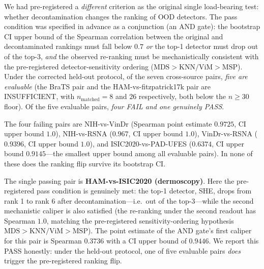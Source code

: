 \documentclass{article}
\begin{document}
We had pre-registered a \emph{different} criterion as the original single
load-bearing test: whether decontamination changes the ranking of OOD detectors.
The pass condition was specified in advance as a conjunction (an AND gate): the
bootstrap CI upper bound of the Spearman correlation between the original and
decontaminated rankings must fall below $0.7$ \emph{or} the top-1 detector must
drop out of the top-3, \emph{and} the observed re-ranking must be mechanistically
consistent with the pre-registered detector-sensitivity ordering
($\text{MDS} > \text{KNN/ViM} > \text{MSP}$). Under the corrected held-out
protocol, of the seven cross-source pairs, \emph{five are evaluable} (the BraTS
pair and the HAM-vs-fitzpatrick17k pair are INSUFFICIENT, with
$n_\text{matched} = 8$ and $26$ respectively, both below the $n \ge 30$ floor).
Of the five evaluable pairs, \emph{four FAIL and one genuinely PASS}.

The four failing pairs are NIH-vs-VinDr (Spearman point estimate $0.9725$, CI
upper bound $1.0$), NIH-vs-RSNA ($0.967$, CI upper bound $1.0$), VinDr-vs-RSNA
($0.9396$, CI upper bound $1.0$), and ISIC2020-vs-PAD-UFES ($0.6374$, CI upper
bound $0.9145$---the smallest upper bound among all evaluable pairs). In none of
these does the ranking flip survive its bootstrap CI.

The single passing pair is \textbf{HAM-vs-ISIC2020 (dermoscopy)}. Here the
pre-registered pass condition is genuinely met: the top-1 detector, SHE, drops
from rank 1 to rank 6 after decontamination---i.e.\ out of the top-3---while the
second mechanistic caliper is also satisfied (the re-ranking under the second
readout has Spearman $1.0$, matching the pre-registered sensitivity-ordering
hypothesis $\text{MDS} > \text{KNN/ViM} > \text{MSP}$). The point estimate of the
AND gate's first caliper for this pair is Spearman $0.3736$ with a CI upper bound
of $0.9446$. We report this PASS honestly: under the held-out protocol, one of
five evaluable pairs \emph{does} trigger the pre-registered ranking flip.
\end{document}

